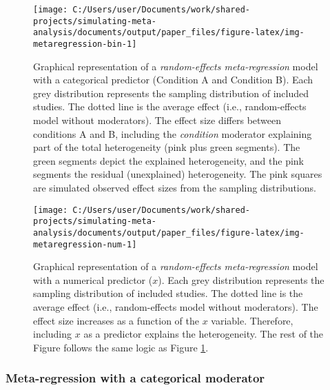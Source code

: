 \documentclass[
  man,floatsintext]{apa6}
\begin{document}
\begin{figure}[H]

{\centering \texttt{[image: C:/Users/user/Documents/work/shared-projects/simulating-meta-analysis/documents/output/paper\_files/figure-latex/img-metaregression-bin-1]} 

}

\caption{Graphical representation of a \emph{random-effects meta-regression} model with a categorical predictor (Condition A and Condition B). Each grey distribution represents the sampling distribution of included studies. The dotted line is the average effect (i.e., random-effects model without moderators). The effect size differs between conditions A and B, including the \emph{condition} moderator explaining part of the total heterogeneity (pink plus green segments). The green segments depict the explained heterogeneity, and the pink segments the residual (unexplained) heterogeneity. The pink squares are simulated observed effect sizes from the sampling distributions.}\label{fig:img-metaregression-bin}
\end{figure}

\normalsize

\scriptsize

\begin{figure}[H]

{\centering \texttt{[image: C:/Users/user/Documents/work/shared-projects/simulating-meta-analysis/documents/output/paper\_files/figure-latex/img-metaregression-num-1]} 

}

\caption{Graphical representation of a \emph{random-effects meta-regression} model with a numerical predictor (\(x\)). Each grey distribution represents the sampling distribution of included studies. The dotted line is the average effect (i.e., random-effects model without moderators). The effect size increases as a function of the \(x\) variable. Therefore, including \(x\) as a predictor explains the
heterogeneity. The rest of the Figure follows the same logic as Figure \ref{fig:img-metaregression-bin}.}\label{fig:img-metaregression-num}
\end{figure}

\normalsize

\subsubsection{Meta-regression with a categorical moderator}\label{meta-regression-with-a-categorical-moderator}
\end{document}
